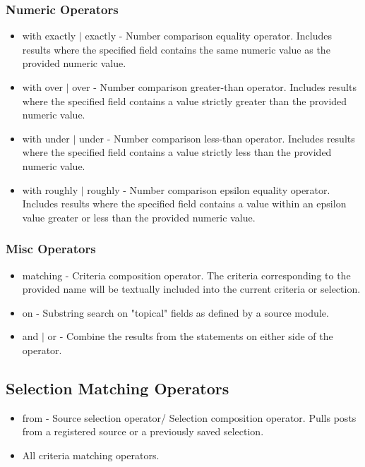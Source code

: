\subsubsection{Numeric Operators}
\begin{itemize}
\item with exactly $|$ exactly - Number comparison equality operator. Includes results where the specified field contains the same numeric value as the provided numeric value.
\item with over $|$ over - Number comparison greater-than operator. Includes results where the specified field contains a value strictly greater than the provided numeric value.
\item with under $|$ under - Number comparison less-than operator. Includes results where the specified field contains a value strictly less than the provided numeric value.
\item with roughly $|$ roughly - Number comparison epsilon equality operator. Includes results where the specified field contains a value within an epsilon value greater or less than the provided numeric value.
\end{itemize}
\subsubsection{Misc Operators}
\begin{itemize}
\item matching - Criteria composition operator. The criteria corresponding to the provided name will be textually included into the current criteria or selection.
\item on - Substring search on "topical" fields as defined by a source module.
\item and $|$ or - Combine the results from the statements on either side of the operator.
\end{itemize}

\subsection{Selection Matching Operators}
\begin{itemize}
    \item from - Source selection operator/ Selection composition operator. Pulls posts from a registered source or a previously saved selection. 
    \item All criteria matching operators.
\end{itemize}

